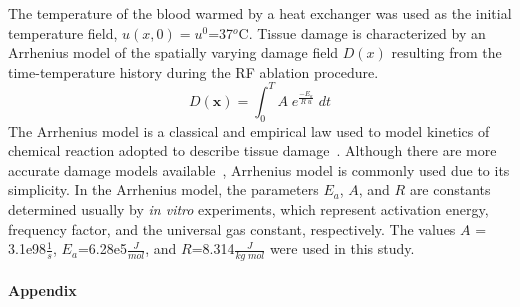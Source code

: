 \documentclass{article}
\newcommand{\picdir}{pdffig}
\begin{document}
The temperature of the blood warmed by a heat exchanger was used
as the initial temperature field, $u(x,0)=u^0$=37$^o$C.
Tissue damage is characterized by an Arrhenius model 
of the spatially varying damage field $D(x)$ resulting from the
time-temperature history during the RF ablation procedure.
\[
D(\textbf{x})  = 
    \int_0^T A \; e^{\frac{-E_a}{R \; u}} \; dt 
\]
The Arrhenius model is a classical and empirical law used to model
kinetics of chemical reaction adopted to describe tissue
damage~\cite{HM5,HM1,HM2}. Although there are more accurate damage models
available~\cite{fengetal08}, Arrhenius model is
commonly used due to its simplicity. In the Arrhenius model, the
parameters $E_a$, $A$, and $R$ are constants determined usually by {\em
in vitro} experiments, which represent activation energy, frequency
factor, and the universal gas constant, respectively. 
The values $A$ = 3.1e98$\frac{1}{s}$, $E_a$=6.28e5$\frac{J}{mol}$,
and $R$=8.314$\frac{J}{kg \; mol}$ were used in this study.

\paragraph{\textbf{{\large Appendix}}}
\end{document}
